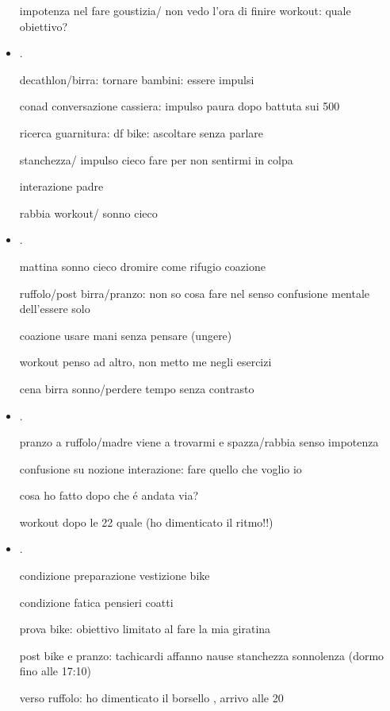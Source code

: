 \begin{itemize}
impotenza nel fare goustizia/ non vedo l’ora di finire workout: quale obiettivo?

\item {}.

decathlon/birra: tornare bambini: essere impulsi

conad conversazione cassiera: impulso paura dopo battuta sui 500

ricerca guarnitura: df bike: ascoltare senza parlare

stanchezza/ impulso cieco fare per non sentirmi in colpa

interazione padre

rabbia workout/ sonno cieco


\item {}.

mattina sonno cieco dromire come rifugio coazione

ruffolo/post birra/pranzo: non so cosa fare nel senso confusione mentale dell’essere solo

coazione usare mani senza pensare (ungere)

workout penso ad altro, non metto me negli esercizi

cena birra sonno/perdere tempo senza contrasto

\item {}.

pranzo a ruffolo/madre viene a trovarmi e spazza/rabbia senso impotenza

confusione su nozione interazione: fare quello che voglio io

cosa ho fatto dopo che \'e andata via?

workout dopo le 22 quale (ho dimenticato il ritmo!!)

\item {}.

condizione preparazione vestizione bike 

condizione fatica pensieri coatti


prova bike: obiettivo limitato al fare la mia giratina

post bike e pranzo: tachicardi affanno nause stanchezza sonnolenza (dormo fino alle 17:10)

verso ruffolo: ho dimenticato il borsello , arrivo alle 20




\end{itemize}
